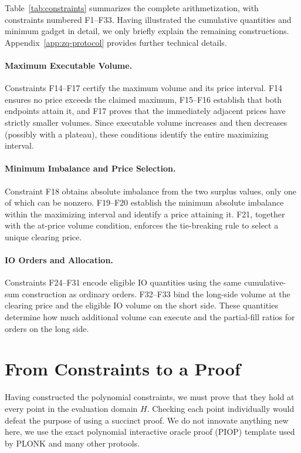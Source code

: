 Table~\ref{tab:constraints} summarizes the complete arithmetization, with constraints numbered F1--F33. Having illustrated the cumulative quantities and minimum gadget in detail, we only briefly explain the remaining constructions. Appendix~\ref{app:zq-protocol} provides further technical details.

\paragraph{Maximum Executable Volume.}
Constraints F14--F17 certify the maximum volume and its price interval. F14 ensures no price exceeds the claimed maximum, F15--F16 establish that both endpoints attain it, and F17 proves that the immediately adjacent prices have strictly smaller volumes. Since executable volume increases and then decreases (possibly with a plateau), these conditions identify the entire maximizing interval.

\paragraph{Minimum Imbalance and Price Selection.}
Constraint F18 obtains absolute imbalance from the two surplus values, only one of which can be nonzero. F19--F20 establish the minimum absolute imbalance within the maximizing interval and identify a price attaining it. F21, together with the at-price volume condition, enforces the tie-breaking rule to select a unique clearing price.

\paragraph{IO Orders and Allocation.}
Constraints F24--F31 encode eligible IO quantities using the same cumulative-sum construction as ordinary orders. F32--F33 bind the long-side volume at the clearing price and the eligible IO volume on the short side. These quantities determine how much additional volume can execute and the partial-fill ratios for orders on the long side.


\section{From Constraints to a Proof}
\label{sec:proving-constraints}

Having constructed the polynomial constraints, we must prove that they hold at every point in the evaluation domain $H$. Checking each point individually would defeat the purpose of using a succinct proof. We do not innovate anything new here, we use the exact polynomial interactive oracle proof (PIOP) template used by PLONK and many other protools.

